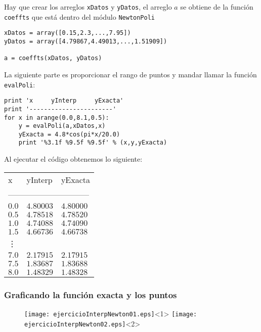 \begin{frame}[fragile]
Hay que crear los arreglos \texttt{xDatos} y \texttt{yDatos}, el arreglo $a$ se obtiene de la función \texttt{coeffts} que está dentro del módulo \texttt{NewtonPoli}
\begin{lstlisting}
xDatos = array([0.15,2.3,...,7.95])
yDatos = array([4.79867,4.49013,...,1.51909])

a = coeffts(xDatos, yDatos)
\end{lstlisting}
\end{frame}
\begin{frame}[fragile]
La siguiente parte es proporcionar el rango de puntos y mandar llamar la función \texttt{evalPoli}:
\\
\medskip
\begin{lstlisting}
print 'x     yInterp     yExacta'
print '-----------------------'
for x in arange(0.0,8.1,0.5):
    y = evalPoli(a,xDatos,x)
    yExacta = 4.8*cos(pi*x/20.0)
    print '%3.1f %9.5f %9.5f' % (x,y,yExacta)
\end{lstlisting}
\end{frame}
\begin{frame}
Al ejecutar el código obtenemos lo siguiente:
\begin{center}
\begin{tabular}{l l l}
x & yInterp & yExacta \\
\multicolumn{3}{l}{------------------------------} \\
$0.0$ & $4.80003$ & $4.80000$ \\
$0.5$ & $4.78518$ & $4.78520$ \\
$1.0$ & $4.74088$ & $4.74090$ \\
$1.5$ & $4.66736$ & $4.66738$ \\
\vdots \\
$7.0$ & $2.17915$ & $2.17915$ \\
$7.5$ & $1.83687$ & $1.83688$ \\
$8.0$ & $1.48329$ & $1.48328$
\end{tabular}
\end{center}
\end{frame}
\begin{frame}
\frametitle{Graficando la función exacta y los puntos}
\begin{figure}
	\centering
	\texttt{[image: ejercicioInterpNewton01.eps]}<1> 
	\texttt{[image: ejercicioInterpNewton02.eps]}<2>
\end{figure}
\end{frame}
